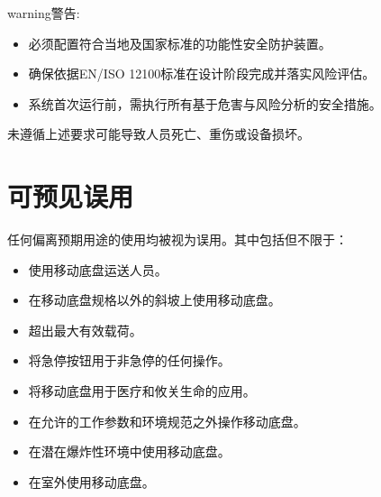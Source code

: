 \documentclass[a4paper,11pt,english,openany,oneside]{sphinxmanual}
\begin{document}
\begin{sphinxadmonition}{warning}{警告:}
\sphinxAtStartPar
{}
\begin{itemize}
\item {} 
\sphinxAtStartPar
必须配置符合当地及国家标准的功能性安全防护装置。

\item {} 
\sphinxAtStartPar
确保依据EN/ISO 12100标准在设计阶段完成并落实风险评估。

\item {} 
\sphinxAtStartPar
系统首次运行前，需执行所有基于危害与风险分析的安全措施。

\end{itemize}

\sphinxAtStartPar
未遵循上述要求可能导致人员死亡、重伤或设备损坏。
\end{sphinxadmonition}


\section{可预见误用}
\label{\detokenize{05 _u5b89_u5168_u89c4_u8303:id9}}
\sphinxAtStartPar
任何偏离预期用途的使用均被视为误用。其中包括但不限于：
\begin{itemize}
\item {} 
\sphinxAtStartPar
使用移动底盘运送人员。

\item {} 
\sphinxAtStartPar
在移动底盘规格以外的斜坡上使用移动底盘。

\item {} 
\sphinxAtStartPar
超出最大有效载荷。

\item {} 
\sphinxAtStartPar
将急停按钮用于非急停的任何操作。

\item {} 
\sphinxAtStartPar
将移动底盘用于医疗和攸关生命的应用。

\item {} 
\sphinxAtStartPar
在允许的工作参数和环境规范之外操作移动底盘。

\item {} 
\sphinxAtStartPar
在潜在爆炸性环境中使用移动底盘。

\item {} 
\sphinxAtStartPar
在室外使用移动底盘。

\end{itemize}
\end{document}
